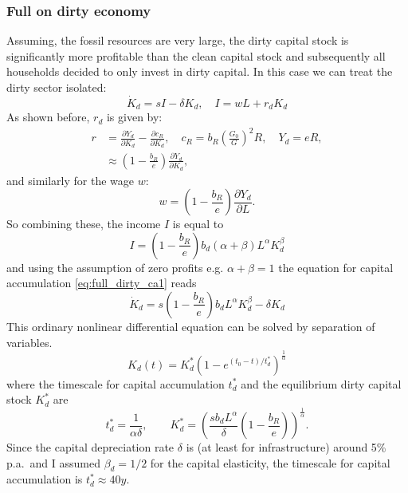 \subsubsection{Full on dirty economy}
\label{sec:full_dirty_economy}

Assuming, the fossil resources are very large, the dirty capital stock is significantly more profitable than the clean capital stock and subsequently all households decided to only invest in dirty capital. In this case we can treat the dirty sector isolated:
\begin{equation}
	\dot{K}_d = s I - \delta K_d, \quad I = w L + r_d K_d
	\label{eq:full_dirty_ca1}
\end{equation}
As shown before, $r_d$ is given by:
\begin{align}
	r &= \frac{\partial Y_d}{\partial K_d} - \frac{\partial c_R}{\partial K_d}, \quad c_R = b_R\left( \frac{G_0}{G} \right)^{2} R, \quad Y_d = eR, \\
	&\approx \left( 1-\frac{b_R}{e} \right)\frac{\partial Y_d}{\partial K_d},
	\label{eq:full_dirty_capital_rent}
\end{align}
and similarly for the wage $w$:
\begin{equation}
	w = \left( 1-\frac{b_R}{e} \right)\frac{\partial Y_d}{\partial L}.
	\label{eq:full_dirty_wage}
\end{equation}
So combining these, the income $I$ is equal to
\begin{equation}
	I = \left( 1-\frac{b_R}{e} \right)b_d (\alpha + \beta) L^{\alpha} K_d^{\beta}
	\label{eq_full_dirty_income}
\end{equation}
and using the assumption of zero profits e.g. $\alpha + \beta = 1$ the equation for capital accumulation \eqref{eq:full_dirty_ca1} reads
\begin{equation}
	\dot{K}_d = s\left( 1 - \frac{b_R}{e} \right) b_d L^{\alpha} K_d^{\beta} - \delta K_d
	\label{eq:full_dirty_ca2}
\end{equation}
This ordinary nonlinear differential equation can be solved by separation of variables.
\begin{equation}
  K_d (t) = K_d^{*} \left(1 - e^{(t_0-t)/t_d^{*}} \right)^{\frac{1}{\alpha}}
	\label{eq:dirty_capital_ac_solution}
\end{equation}
where the timescale for capital accumulation $t^*_d$ and the equilibrium dirty capital stock $K^*_d$ are
\begin{equation}
	t_d^{*} = \frac{1}{\alpha \delta}, \qquad K_d^{*} = \left( \frac{s b_d L^\alpha}{\delta}\left(1-\frac{b_R}{e}  \right) \right)^{\frac{1}{\alpha}}.
	\label{eq:full_dirty_capital_equilibrium_values}
\end{equation}
Since the capital depreciation rate $\delta$ is (at least for infrastructure) around 5\% p.a.\ and I assumed $\beta_d=1/2$ for the capital elasticity, the timescale for capital accumulation is $t^*_d \approx 40 y$.





